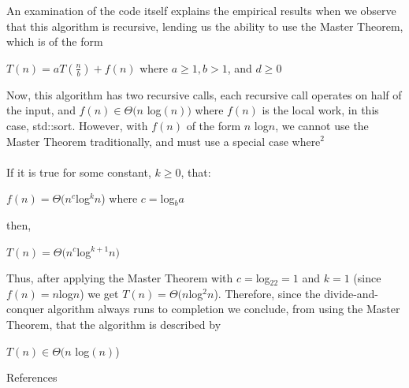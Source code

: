 \documentclass[11pt]{article}
\begin{document}
\begin{center}
    
\end{center}

An examination of the code itself explains the empirical results when we observe that this algorithm is recursive, lending us the ability to use the Master Theorem, which is of the form
\begin{center}
	$T(n)=aT(\frac{n}{b}) + f(n)$ where $a \geq 1, b > 1$, and $d \geq 0$
\end{center}

Now, this algorithm has two recursive calls, each recursive call operates on half of the input, and $f(n) \in \Theta( n$ log$(n) )$ where $f(n)$ is the local work, in this case, std::sort. However, with $f(n)$ of the form $n$ log$n$, we cannot use the Master Theorem traditionally, and must use a special case where$^2$ \\ \\
	If it is true for some constant, $k\geq 0$, that: \\

\begin{center}
	$f(n) = \Theta(n^c$log$^kn$) where $c=$log$_ba$ \\
\end{center}
	then, \\
\begin{center}
	$T(n) = \Theta(n^c$log$^{k+1}n)$
\end{center}

 Thus, after applying the Master Theorem with $c=$log$_22=1$ and $k=1$ (since $f(n)=n$log$n$) we get $T(n)=\Theta(n$log$^2n$). 
Therefore, since the divide-and-conquer algorithm always runs to completion we conclude, from using the Master Theorem, that the algorithm is described by

\begin{center}
$T(n) \in \Theta( n $ log$(n)$)
\end{center}

\clearpage
\begin{center}
{\large References}\\
\end{center}
\end{document}
